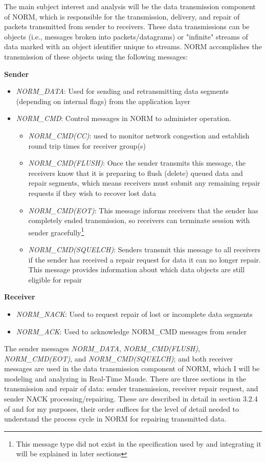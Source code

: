\documentclass[10pt, journal]{IEEEtran}
\begin{document}
The main subject interest and analysis will be the data transmission component of NORM, which is responsible for the transmission, delivery, and repair of packets transmitted from sender to receivers. These data transmissions can be objects (i.e., messages broken into packets/datagrams) or "infinite" streams of data marked with an object identifier unique to streams. NORM accomplishes the transmission of these objects using the following messages:

\textbf{Sender}
\begin{itemize}
	\item \textit{NORM\_DATA}: Used for sending and retransmitting data segments (depending on internal flags) from the application layer
	\item \textit{NORM\_CMD}: Control messages in NORM to administer operation.
	\begin{itemize}
		\item \textit{NORM\_CMD(CC)}: used to monitor network congestion and establish round trip times for receiver group(s)
		\item \textit{NORM\_CMD(FLUSH)}: Once the sender transmits this message, the receivers know that it is preparing to flush (delete) queued data and repair segments, which means receivers must submit any remaining repair requests if they wish to recover lost data
		\item \textit{NORM\_CMD(EOT)}: This message informs receivers that the sender has completely ended transmission, so receivers can terminate session with sender gracefully\footnote{This message type did not exist in the specification used by \cite{Lien2004} and integrating it will be explained in later sections}
		\item \textit{NORM\_CMD(SQUELCH)}: Senders transmit this message to all receivers if the sender has received a repair request for data it can no longer repair. This message provides information about which data objects are still eligible for repair
	\end{itemize}
\end{itemize}

\textbf{Receiver}
\begin{itemize}
	\item \textit{NORM\_NACK}: Used to request repair of lost or incomplete data segments
	\item \textit{NORM\_ACK}: Used to acknowledge NORM\_CMD messages from sender
\end{itemize}

The sender messages \textit{NORM\_DATA}, \textit{NORM\_CMD(FLUSH)}, \textit{NORM\_CMD(EOT)}, and \textit{NORM\_CMD(SQUELCH)}; and both receiver messages are used in the data transmission component of NORM, which I will be modeling and analyzing in Real-Time Maude. There are three sections in the transmission and repair of data: sender transmission, receiver repair request, and sender NACK processing/repairing. These are described in detail in section 3.2.4 of \cite{Lien2004} and for my purposes, their order suffices for the level of detail needed to understand the process cycle in NORM for repairing transmitted data.
\end{document}
